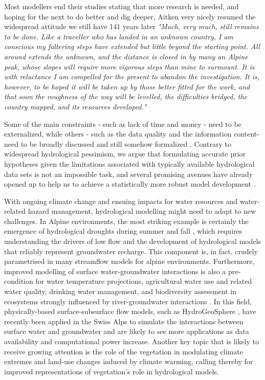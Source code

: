 \documentclass[10pt,a4paper]{article}
\begin{document}
Most modellers end their studies stating that more research is needed, and hoping for the next to do better and dig deeper, Aitken very nicely resumed the widespread attitude we still have 141 years later \textit{"Much, very much, still remains to be done. Like a traveller who has landed in an unknown country, I am conscious my faltering steps have extended but little beyond the starting point. All around extends the unknown, and the distance is closed in by many an Alpine peak, whose slopes will require more vigorous steps than mine to surmount. It is with reluctance I am compelled for the present to abandon the investigation. It is, however, to be hoped it will be taken up by those better fitted for the work, and that soon the roughness of the way will be levelled, the difficulties bridged, the country mapped, and its resources developed."} \citep{Aitken1880}

Some of the main constraints - such as lack of time and money - need to be externalized, while others - such as the data quality and the information content- need to be broadly discussed and still somehow formalized \citep{Zheng2018}.   Contrary to widespread hydrological pessimism, we argue that formulating accurate prior hypotheses given the limitations associated with typically available hydrological data sets is not an impossible task, and several promising avenues have already opened up to help us to achieve a statistically more robust model development \citep{Renard2010,Zheng2018}.

With ongoing climate change and ensuing impacts for water resources and water-related hazard management, hydrological modelling might need to adapt to new challenges. In Alpine environments, the most striking example is certainly the emergence of hydrological droughts \citep{VanLoon2015} during summer and fall \citep{Brunner2019e, Rigling2020}, which requires understanding the drivers of low flow \citep{Arnoux2020} and the development of hydrological models that reliably represent groundwater recharge. This component is, in fact, crudely parametrised in many streamflow models for alpine environments. Furthermore, improved modelling of surface water-groundwater interactions is also a pre-condition for water temperature projections, agricultural water use and related water quality, drinking water management, and biodiversity assessment in ecosystems strongly influenced by river-groundwater interactions \citep{Brunner2017}. 
In this field, physically-based surface-subsurface flow models, such as HydroGeoSphere \citep{Therrien2010}, have recently been applied in the Swiss Alps to simulate the interactions between surface water and groundwater \citep{Tang2018, Thornton2021a} and are likely to see more applications as data availability and computational power increase. Another key topic that is likely to receive growing attention is the role of the vegetation in modulating climate extremes \citep{Mastrotheodoros2020} and land-use changes induced by climate warming, calling thereby for improved representations of vegetation's role in hydrological models.
\end{document}
